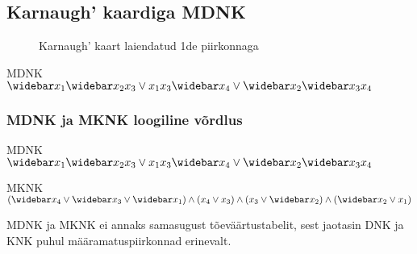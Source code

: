 \subsection{Karnaugh' kaardiga MDNK}

\begin{figure}[H]
\centering
\begin{Karnaugh}
\end{Karnaugh}
\caption{Karnaugh' kaart laiendatud 1de piirkonnaga}
\label{fig:karnaugh-piirkond1}
\end{figure}
MDNK $\wb{x_1}\wb{x_2}x_3 \lor x_1x_3\wb{x_4} \lor \wb{x_2}\wb{x_3}x_4$


\subsubsection{MDNK ja MKNK loogiline võrdlus}
MDNK $\wb{x_1}\wb{x_2}x_3 \lor x_1x_3\wb{x_4} \lor \wb{x_2}\wb{x_3}x_4$

MKNK $(\wb{x_4} \lor \wb{x_3} \lor \wb{x_1}) \land (x_4 \lor x_3) \land (x_3 \lor \wb{x_2}) \land (\wb{x_2} \lor x_1)$

MDNK ja MKNK ei annaks samasugust tõeväärtustabelit, sest jaotasin DNK ja KNK puhul määramatuspiirkonnad erinevalt.